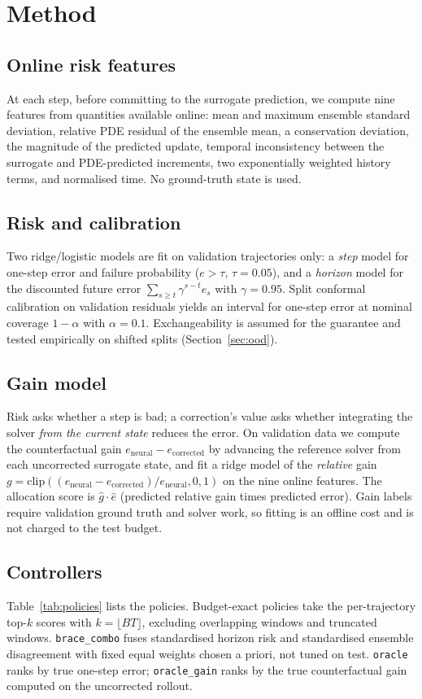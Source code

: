 \documentclass[11pt]{article}
\begin{document}
\section{Method}

\subsection{Online risk features}
At each step, before committing to the surrogate prediction, we compute nine
features from quantities available online: mean and maximum ensemble standard
deviation, relative PDE residual of the ensemble mean, a conservation
deviation, the magnitude of the predicted update, temporal inconsistency between
the surrogate and PDE-predicted increments, two exponentially weighted history
terms, and normalised time. No ground-truth state is used.

\subsection{Risk and calibration}
Two ridge/logistic models are fit on validation trajectories only: a \emph{step}
model for one-step error and failure probability ($e>\tau$, $\tau=0.05$), and a
\emph{horizon} model for the discounted future error
$\sum_{s\ge t}\gamma^{s-t}e_s$ with $\gamma=0.95$. Split conformal calibration
on validation residuals yields an interval for one-step error at nominal
coverage $1-\alpha$ with $\alpha=0.1$. Exchangeability is assumed for the
guarantee and tested empirically on shifted splits
(Section~\ref{sec:ood}).

\subsection{Gain model}
Risk asks whether a step is bad; a correction's value asks whether integrating
the solver \emph{from the current state} reduces the error. On validation data
we compute the counterfactual gain $e_{\text{neural}}-e_{\text{corrected}}$ by
advancing the reference solver from each uncorrected surrogate state, and fit a
ridge model of the \emph{relative} gain
$g=\mathrm{clip}((e_{\text{neural}}-e_{\text{corrected}})/e_{\text{neural}},0,1)$
on the nine online features. The allocation score is
$\hat{g}\cdot\hat{e}$ (predicted relative gain times predicted error). Gain
labels require validation ground truth and solver work, so fitting is an
offline cost and is not charged to the test budget.

\subsection{Controllers}
Table~\ref{tab:policies} lists the policies. Budget-exact policies take the
per-trajectory top-$k$ scores with $k=\lfloor BT\rfloor$, excluding overlapping
windows and truncated windows. \texttt{brace\_combo} fuses standardised horizon
risk and standardised ensemble disagreement with fixed equal weights chosen a
priori, not tuned on test. \texttt{oracle} ranks by true one-step error;
\texttt{oracle\_gain} ranks by the true counterfactual gain computed on the
uncorrected rollout.
\end{document}
